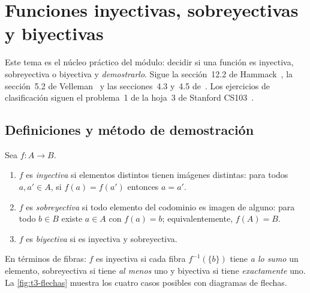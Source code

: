 \chapter{Funciones inyectivas, sobreyectivas y biyectivas}
\label{tema:3}

Este tema es el núcleo práctico del módulo: decidir si una función es inyectiva, sobreyectiva o biyectiva y \emph{demostrarlo}. Sigue la sección~12.2 de Hammack~\cite{hammack}, la sección~5.2 de Velleman~\cite{velleman} y las secciones~4.3 y~4.5 de~\cite{mcs}. Los ejercicios de clasificación siguen el problema~1 de la hoja~3 de Stanford CS103~\cite{cs103ps3}.

\section{Definiciones y método de demostración}

\begin{definicion}\label{def:t3-iny}
Sea $f\colon A\to B$.
\begin{enumerate}
  \item $f$ es \emph{inyectiva} si elementos distintos tienen imágenes distintas: para todos $a,a'\in A$, si $f(a)=f(a')$ entonces $a=a'$.
  \item $f$ es \emph{sobreyectiva} si todo elemento del codominio es imagen de alguno: para todo $b\in B$ existe $a\in A$ con $f(a)=b$; equivalentemente, $f(A)=B$.
  \item $f$ es \emph{biyectiva} si es inyectiva y sobreyectiva.
\end{enumerate}
\end{definicion}

En términos de fibras: $f$ es inyectiva si cada fibra $f^{-1}(\{b\})$ tiene \emph{a lo sumo} un elemento, sobreyectiva si tiene \emph{al menos} uno y biyectiva si tiene \emph{exactamente} uno. La \cref{fig:t3-flechas} muestra los cuatro casos posibles con diagramas de flechas.

